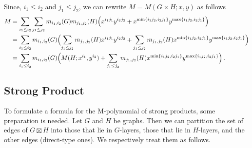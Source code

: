 \documentclass[letterpaper,12pt]{article}
\begin{document}
Since, $i_1\le i_2$ and $j_1\le j_2$, we can rewrite $M = M(G\times H;x,y)$ as follows
\begin{equation*}
\begin{aligned}
M &=\sum_{i_1\le i_2} \sum_{j_1\le j_2}
m_{i_1,i_2}(G) m_{j_1,j_2}(H) 
\Bigl( x^{i_1j_1}y^{i_2j_2}+
x^{\min\{i_1j_2,  i_2j_1\}}y^{\max\{i_1j_2,  i_2j_1\}}
\Bigr)\\
&=\sum_{i_1\le i_2}m_{i_1,i_2}(G) 
\Bigl( \sum_{j_1\le j_2}
 m_{j_1,j_2}(H) x^{i_1j_1}y^{i_2j_2}+\sum_{j_1\le j_2}
 m_{j_1,j_2}(H) 
x^{\min\{i_1j_2,  i_2j_1\}}y^{\max\{i_1j_2,  i_2j_1\}}
\Bigr)\\
&=\sum_{i_1\le i_2}m_{i_1,i_2}(G) 
\Bigl( M(H;x^{i_1},y^{i_2})+\sum_{j_1\le j_2}
 m_{j_1,j_2}(H) 
x^{\min\{i_1j_2,  i_2j_1\}}y^{\max\{i_1j_2,  i_2j_1\}}
\Bigr)\,.
\end{aligned}
\end{equation*}



\subsection{Strong Product}
 \label{sec:Strong}

To formulate a formula for the M-polynomial of strong products, some preparation is needed. Let $G$ and $H$ be graphs. Then we can partition the set of edges of $G\boxtimes H$ into those that lie in $G$-layers, those that lie in $H$-layers, and the other edges (direct-type ones). We respectively treat them as follows. 
\end{document}
